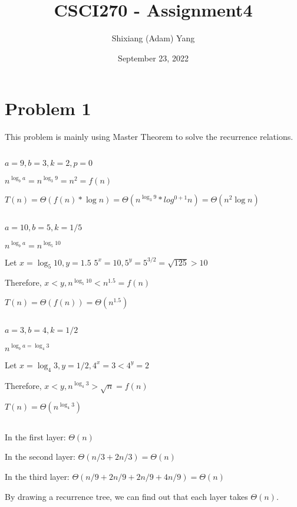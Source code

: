 \documentclass{article}
\author{Shixiang (Adam) Yang}
\date{September 23, 2022}
\title{CSCI270 - Assignment4}
\begin{document}
 \maketitle
\section{Problem 1}
This problem is mainly using Master Theorem to solve the recurrence relations.
\subsection{}
$a = 9, b = 3, k = 2, p = 0$

$n^{\log_b{a}} = n^{\log_3{9}} = n^2 = f(n)$

$T(n) = \Theta(f(n)*\log{n}) = \Theta(n^{\log_3{9}}*log^{0+1}{n}) = \Theta(n^2\log{n})$

\subsection{}

$a=10, b=5, k = 1/5$

$n^{\log_b{a}}=n^{\log_5{10}}$

Let $x = \log_5{10}, y = 1.5$
$5^x = 10, 5^y = 5^{3/2} = \sqrt{125} > 10$

Therefore, $x < y, n^{\log_5{10}} < n^{1.5} = f(n)$

$T(n) = \Theta(f(n)) = \Theta(n^{1.5})$

\subsection{}

$a=3,b=4,k=1/2$

$n^{\log_b{a} = \log_4{3}}$

Let $x=\log_4{3}, y = 1/2, 4^x = 3 < 4^y = 2$

Therefore, $x<y, n^{\log_4{3}} > \sqrt{n} = f(n)$

$T(n)=\Theta(n^{\log_4{3}})$

\subsection{}

In the first layer: $\Theta(n)$

In the second layer: $\Theta(n/3+2n/3)=\Theta(n)$

In the third layer:
$\Theta(n/9+2n/9+2n/9+4n/9)=\Theta(n)$

By drawing a recurrence tree, we can find out that each layer takes $\Theta(n)$.
\end{document}
